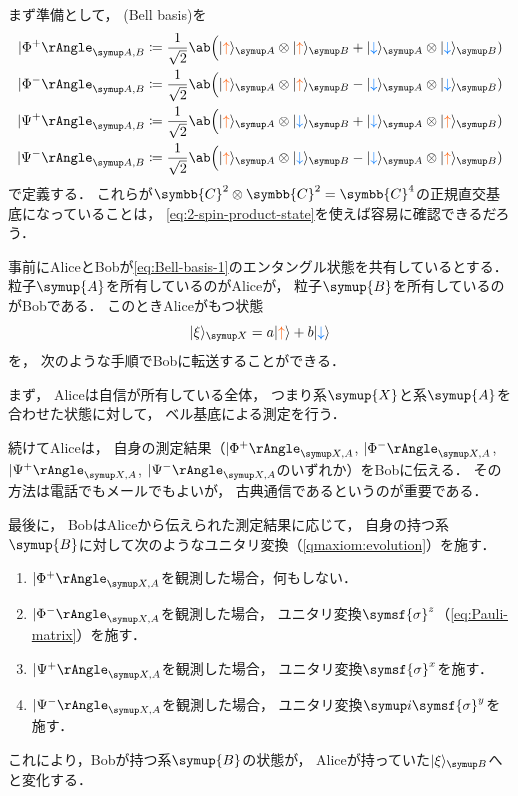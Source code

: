 \documentclass[
]{sotsu}
\newcommand{\bitone}{\mathcolor{fire}{\uparrow}}
\newcommand{\bittwo}{\mathcolor{water}{\downarrow}}
\begin{document}
\quad 
まず準備として，
(Bell basis)を
\begin{subequations}
    \label{eq:Bell-basis}
    \begin{align}
        \label{eq:Bell-basis-1}
        \Ket{\Phi^+}<A,B> 
            &\coloneq \frac{1}{\sqrt{2}}
                \ab\Big( \ket{\bitone}<A> \otimes \ket{\bitone}<B> + \ket{\bittwo}<A> \otimes \ket{\bittwo}<B> )
        \\
        \Ket{\Phi^-}<A,B> 
            &\coloneq \frac{1}{\sqrt{2}}
                \ab\Big( \ket{\bitone}<A> \otimes \ket{\bitone}<B> - \ket{\bittwo}<A> \otimes \ket{\bittwo}<B> )
        \\
        \Ket{\Psi^+}<A,B> 
            &\coloneq \frac{1}{\sqrt{2}}
                \ab\Big( \ket{\bitone}<A> \otimes \ket{\bittwo}<B> + \ket{\bittwo}<A> \otimes \ket{\bitone}<B> )
        \\
        \Ket{\Psi^-}<A,B> 
            &\coloneq \frac{1}{\sqrt{2}}
                \ab\Big( \ket{\bitone}<A> \otimes \ket{\bittwo}<B> - \ket{\bittwo}<A> \otimes \ket{\bitone}<B> )
    \end{align}
\end{subequations}
で定義する．
これらが$\symbb{C}^2 \otimes \symbb{C}^2 = \symbb{C}^4$の正規直交基底になっていることは，
\cref{eq:2-spin-product-state}を使えば容易に確認できるだろう．



\quad 
事前にAliceとBobが\cref{eq:Bell-basis-1}のエンタングル状態を共有しているとする．
粒子$\symup{A}$を所有しているのがAliceが，
粒子$\symup{B}$を所有しているのがBobである．
このときAliceがもつ状態
\begin{equation}
    \label{eq:state-of-Alice}
    \ket{\xi}<X> = a \ket{\bitone} + b \ket{\bittwo}
\end{equation}
を，
次のような手順でBobに転送することができる．

まず，
Aliceは自信が所有している全体，
つまり系$\symup{X}$と系$\symup{A}$を合わせた状態に対して，
ベル基底による測定を行う．

続けてAliceは，
自身の測定結果（$\Ket{\Phi^+}<X,A>$, $\Ket{\Phi^-}<X,A>$, $\Ket{\Psi^+}<X,A>$, $\Ket{\Psi^-}<X,A>$のいずれか）をBobに伝える．
その方法は電話でもメールでもよいが，
古典通信であるというのが重要である．

最後に，
BobはAliceから伝えられた測定結果に応じて，
自身の持つ系$\symup{B}$に対して次のようなユニタリ変換（\cref{qmaxiom:evolution}）を施す．
\begin{enumerate}
    \item $\Ket{\Phi^+}<X,A>$を観測した場合，何もしない．
    \item $\Ket{\Phi^-}<X,A>$を観測した場合，
        ユニタリ変換$\symsf{\sigma}^z$（\cref{eq:Pauli-matrix}）を施す．
    \item $\Ket{\Psi^+}<X,A>$を観測した場合，
        ユニタリ変換$\symsf{\sigma}^x$を施す．
    \item $\Ket{\Psi^-}<X,A>$を観測した場合，
        ユニタリ変換$\iu \symsf{\sigma}^y$を施す．
\end{enumerate}
これにより，Bobが持つ系$\symup{B}$の状態が，
Aliceが持っていた$\ket{\xi}<B>$へと変化する．
\end{document}
